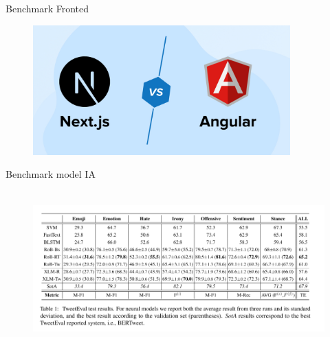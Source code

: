 \begin{frame}{Benchmark Fronted}
    \begin{figure}[H]
        \centering
        \includegraphics[height=5cm]{assets/images/bench-next.jpg}
    \end{figure}
\end{frame}

\begin{frame}{Benchmark model IA}
    \begin{figure}[H]
        \centering
        \includegraphics[height=6cm]{assets/images/ai-acc-dataset.png}
    \end{figure}
\end{frame}

